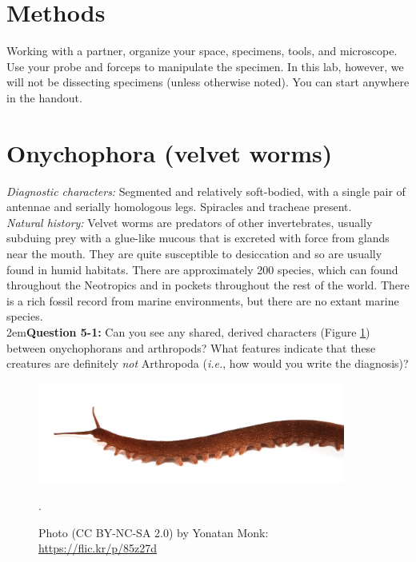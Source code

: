 \documentclass[letterpaper, 11pt]{article}
\begin{document}
\section*{Methods}
Working with a partner, organize your space, specimens, tools, and microscope. Use your probe and forceps to manipulate the specimen. In this lab, however, we will not be dissecting specimens (unless otherwise noted). You can start anywhere in the handout.

\section{Onychophora (velvet worms)}
\noindent{}\textit{Diagnostic characters:} Segmented and relatively soft-bodied, with a single pair of antennae and serially homologous legs. Spiracles and tracheae present.\\

\noindent{}\textit{Natural history:} Velvet worms are predators of other invertebrates, usually subduing prey with a glue-like mucous that is excreted with force from glands near the mouth. They are quite susceptible to desiccation and so are usually found in humid habitats. There are approximately 200 species, which can found throughout the Neotropics and in pockets throughout the rest of the world. There is a rich fossil record from marine environments, but there are no extant marine species.\\

\hangindent2em\textbf{Question 5-1:} Can you see any shared, derived characters (Figure \ref{fig:onych}) between onychophorans and arthropods? What features indicate that these creatures are definitely \textit{not} Arthropoda (\textit{i.e.}, how would you write the diagnosis)? 

\begin{figure}[ht!]
  \centering
    \includegraphics[width=0.9\textwidth]{onych}
  \caption{Photo (CC BY-NC-SA 2.0) by Yonatan Monk: \url{https://flic.kr/p/85z27d}}.
  \label{fig:onych}
\end{figure}
\end{document}
